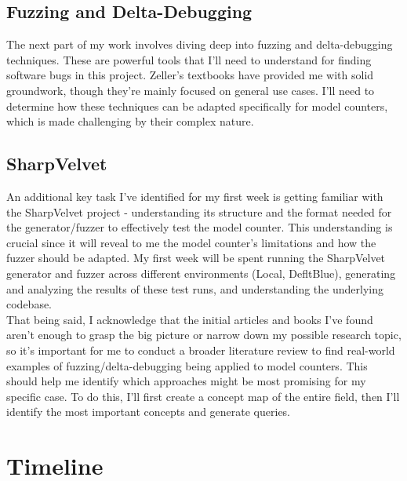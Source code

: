 \documentclass[english, a4paper]{article}
\begin{document}
\subsection*{Fuzzing and Delta-Debugging}

The next part of my work involves diving deep into fuzzing and delta-debugging techniques. These are powerful tools that I'll need to understand for finding software bugs in this project. Zeller's \parencite{Zeller2023, Zeller2024} textbooks have provided me with solid groundwork, though they're mainly focused on general use cases. I'll need to determine how these techniques can be adapted specifically for model counters, which is made challenging by their complex nature.

\subsection*{SharpVelvet}

An additional key task I've identified for my first week is getting familiar with the SharpVelvet project - understanding its structure and the format needed for the generator/fuzzer to effectively test the model counter. This understanding is crucial since it will reveal to me the model counter's limitations and how the fuzzer should be adapted. My first week will be spent running the SharpVelvet generator and fuzzer across different environments (Local, DefltBlue), generating and analyzing the results of these test runs, and understanding the underlying codebase.\\


That being said, I acknowledge that the initial articles and books I've found aren't enough to grasp the big picture or narrow down my possible research topic, so it's important for me to conduct a broader literature review to find real-world examples of fuzzing/delta-debugging being applied to model counters. This should help me identify which approaches might be most promising for my specific case. To do this, I'll first create a concept map of the entire field, then I'll identify the most important concepts and generate queries.

\section*{Timeline}
\end{document}
